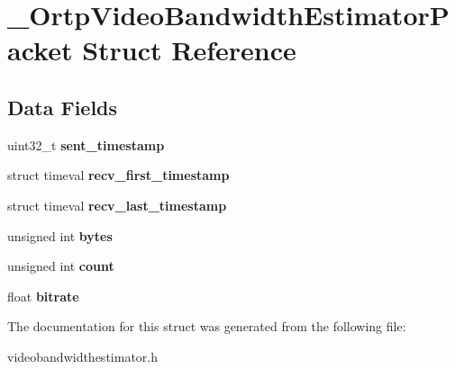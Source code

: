 \section{\+\_\+\+Ortp\+Video\+Bandwidth\+Estimator\+Packet Struct Reference}
\label{struct__OrtpVideoBandwidthEstimatorPacket}
\subsection*{Data Fields}
\begin{DoxyCompactItemize}
\item 
\mbox{\label{struct__OrtpVideoBandwidthEstimatorPacket_ad4aeac42336412a736e6bb09d06bc107}} 
uint32\+\_\+t {\bfseries sent\+\_\+timestamp}
\item 
\mbox{\label{struct__OrtpVideoBandwidthEstimatorPacket_af310c214671debb648f8486e4c5ef152}} 
struct timeval {\bfseries recv\+\_\+first\+\_\+timestamp}
\item 
\mbox{\label{struct__OrtpVideoBandwidthEstimatorPacket_a7e28ae8485e3f871d3034eb4e0f5bac5}} 
struct timeval {\bfseries recv\+\_\+last\+\_\+timestamp}
\item 
\mbox{\label{struct__OrtpVideoBandwidthEstimatorPacket_a014e9a11042dd640d7f53853a7891d42}} 
unsigned int {\bfseries bytes}
\item 
\mbox{\label{struct__OrtpVideoBandwidthEstimatorPacket_a09747cb94e6bc16639eac570007eb2cf}} 
unsigned int {\bfseries count}
\item 
\mbox{\label{struct__OrtpVideoBandwidthEstimatorPacket_aa94db934b2e6a8d93549c02a9cb8bcaa}} 
float {\bfseries bitrate}
\end{DoxyCompactItemize}


The documentation for this struct was generated from the following file\+:\begin{DoxyCompactItemize}
\item 
videobandwidthestimator.\+h\end{DoxyCompactItemize}
